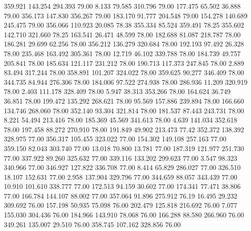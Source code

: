  359.921  143.254  294.393        79.00
   8.133   79.585  310.796        79.00
 177.475   65.502   36.888        79.00
 356.173  147.830  356.267        79.00
 183.170   91.777  204.548        79.00
 154.278  140.689  245.475        79.00
 356.066  110.923   20.085        78.38
 355.334   85.524  359.491        78.25
 355.602  142.710  321.660        78.25
 163.541   26.471   48.599        78.00
 182.688   81.087  218.787        78.00
 186.281   29.699   62.256        78.00
 356.212  136.279  320.684        78.00
 192.193   97.492   26.328        78.00
 235.468  163.492  305.361        78.00
  12.719   46.102  339.788        78.00
 184.739   49.757  205.841        78.00
 185.634  121.117  231.212        78.00
 190.713  117.373  247.845        78.00
   2.889   83.494  317.244        78.00
 358.891  101.207  324.022        78.00
 359.625   90.277  346.409        78.00
 344.735   84.944  276.306        78.00
 184.006   97.522  274.938        78.00
 286.936   11.209  320.919        78.00
   2.403  111.178  328.409        78.00
   5.947   38.313  353.266        78.00
 164.624   36.749   36.851        78.00
 199.472  135.292  268.621        78.00
  95.569  157.886  239.894        78.00
 166.660  134.746  268.060        78.00
 352.140   93.304  321.814        78.00
 181.537   87.443  243.731        78.00
   8.221   54.494  213.416        78.00
 185.369   45.569  341.613        78.00
   4.639  141.034  352.618        78.00
 197.458   88.272  270.910        78.00
 191.849   49.902  213.473        77.42
 352.372  138.392  328.975        77.00
 356.317  105.455  323.022        77.00
 154.302  149.108  257.163        77.00
 359.150   82.043  303.740        77.00
  13.018   70.800   13.781        77.00
 187.319  121.977  251.730        77.00
 337.922   89.260  325.632        77.00
 339.116  133.202  299.623        77.00
   3.547   98.323  340.966        77.00
 346.927  127.822  336.708        77.00
   8.414   65.829  286.027        77.00
 326.510   18.107  152.631        77.00
   2.958  137.904  329.796        77.00
 344.659   88.057  343.439        77.00
  10.910  101.610  338.777        77.00
 172.513   94.159   30.602        77.00
 174.341   77.471   38.806        77.00
 166.784  144.107   88.002        77.00
 357.064   91.896  275.912        76.19
  16.495   29.232  309.692        76.00
 157.198   50.935   75.098        76.00
 202.479  125.818  216.692        76.00
   7.077  155.030  304.436        76.00
 184.966  143.910   78.068        76.00
 166.288   88.580  266.960        76.00
 349.261  135.007   29.510        76.00
 358.745  107.162  328.856        76.00
